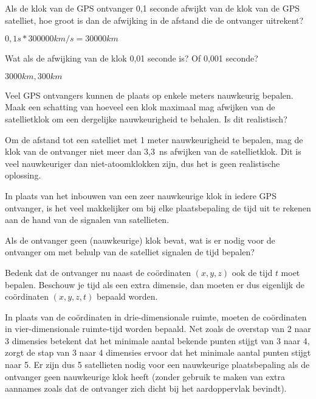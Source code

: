 \begin{opgave}
	\begin{subopgave}
		Als de klok van de GPS ontvanger 0,1 seconde afwijkt van de klok van de GPS satelliet, hoe groot is dan de afwijking in de afstand die de ontvanger uitrekent?
		\begin{antwoord}
			$0,1 s * 300000 km/s = 30000 km$
		\end{antwoord}
	\end{subopgave}
	\begin{subopgave}
		Wat als de afwijking van de klok 0,01 seconde is? Of 0,001 seconde?
		\begin{antwoord}
			$3000 km, 300 km$
		\end{antwoord}
	\end{subopgave}
	\begin{subopgave}
		Veel GPS ontvangers kunnen de plaats op enkele meters nauwkeurig bepalen. Maak een schatting van hoeveel een klok maximaal mag afwijken van de satellietklok om een dergelijke nauwkeurigheid te behalen. Is dit realistisch?
		\begin{antwoord}
			Om de afstand tot een satelliet met 1 meter nauwkeurigheid te bepalen, mag de klok van de ontvanger niet meer dan 3,3~ns afwijken van de satellietklok. Dit is veel nauwkeuriger dan niet-atoomklokken zijn, dus het is geen realistische oplossing.
		\end{antwoord}
	\end{subopgave}
\end{opgave}

In plaats van het inbouwen van een zeer nauwkeurige klok in iedere GPS ontvanger, is het veel makkelijker om bij elke plaatsbepaling de tijd uit te rekenen aan de hand van de signalen van satellieten.

\begin{opgave}[\ster\vinger]
	Als de ontvanger geen (nauwkeurige) klok bevat, wat is er nodig voor de ontvanger om met behulp van de satelliet signalen de tijd bepalen?
	\begin{hint}
		Bedenk dat de ontvanger nu naast de co\"ordinaten $(x, y, z)$ ook de tijd $t$ moet bepalen. Beschouw je tijd als een extra dimensie, dan moeten er dus eigenlijk de co\"ordinaten $(x, y, z, t)$ bepaald worden.
	\end{hint}
	\begin{antwoord}
		In plaats van de co\"ordinaten in drie-dimensionale ruimte, moeten de co\"ordinaten in vier-dimensionale ruimte-tijd worden bepaald. Net zoals de overstap van 2 naar 3 dimensies betekent dat het minimale aantal bekende punten stijgt van 3 naar 4, zorgt de stap van 3 naar 4 dimensies ervoor dat het minimale aantal punten stijgt naar 5. Er zijn dus 5 satellieten nodig voor een nauwkeurige plaatsbepaling als de ontvanger geen nauwkeurige klok heeft (zonder gebruik te maken van extra aannames zoals dat de ontvanger zich dicht bij het aardoppervlak bevindt).
	\end{antwoord} 
\end{opgave}
